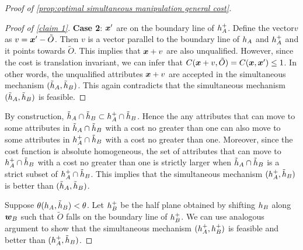 \begin{proof}[Proof of \cref{prop:optimal simultaneous manipulation general cost}]
\begin{proof}[Proof of \cref{claim 1}]
\textbf{Case 2}:  $\boldsymbol{x}'$ are on the boundary line of $h_A^+$.
Define the vector$ v$ as $v=\boldsymbol{x}'-\tilde O$.
Then $v$ is a vector parallel to the boundary line of $h_A$ and $h_A^+$ and it points towards $\tilde O$.
This implies that $\boldsymbol{x}+v$ are also unqualified.
However, since the cost is translation invariant, we can infer that $C(\boldsymbol{x}+v,\tilde O)=C(\boldsymbol{x},\boldsymbol{x}')\leq 1$.
In other words, the unqualified attributes $\boldsymbol{x}+v$ are accepted in the simultaneous mechanism $(\tilde {h}_A,\tilde {h}_B)$.
This again contradicts that the simultaneous mechanism $(\tilde {h}_A,\tilde {h}_B)$ is feasible.
    
\end{proof}


By construction, $\tilde {h}_A\cap\tilde {h}_B\subset h_A^+\cap\tilde {h}_B$.
Hence the any attributes that can move to some attributes in $\tilde{h}_A\cap\tilde {h}_B$ with a cost no greater than one  can also move to some attributes in $h_A^+\cap\tilde {h}_B$ with a cost no greater than one.
Moreover, 
since the cost function is absolute homogeneous, the set of attributes that can move to $h_A^+\cap\tilde {h}_B$ with a cost no greater than one is strictly larger when $\tilde {h}_A\cap\tilde {h}_B$ is a strict subset of $h_A^+\cap\tilde {h}_B$.
This implies that the simultaneous mechanism $(h_A^+,\tilde {h}_B)$ is better than $(\tilde {h}_A,\tilde {h}_B)$.

Suppose $\theta( h_A,\tilde{h}_B)<\theta$.
Let $h_B^+$ be the half plane obtained by shifting $h_B$ along $\boldsymbol{w}_B$ such that $\tilde O$ falls on the boundary line of  $h_B^+$.
We can use analogous argument to show that the simultaneous mechanism $(h_A^+, h_B^+)$ is feasible and better than $( h_A^+,\tilde {h}_B)$.

\end{proof}



